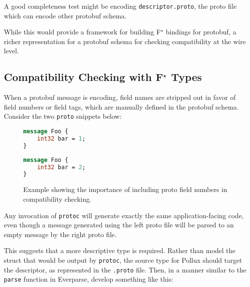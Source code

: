 \documentclass[11pt]{article}
\newcommand{\fstar}{F\(^\star\)}
\theoremstyle{definition}
\begin{document}
A good completeness test might be encoding \texttt{descriptor.proto}, the proto
file which can encode other protobuf schema.

While this would provide a framework for building \fstar{} bindings for
protobuf, a richer representation for a protobuf schema for checking
compatibility at the wire level.

\subsection{Compatibility Checking with \fstar{} Types}

When a protobuf message is encoding, field names are stripped out in favor of
field numbers or field tags, which are manually defined in the protobuf
schema. Consider the two \texttt{proto} snippets below:

\begin{figure}[H]
	\centering
	\begin{minipage}[bt]{0.4\textwidth}
		\begin{lstlisting}[language=proto]
message Foo {
    int32 bar = 1;
}\end{lstlisting}
	\end{minipage}
	\hspace{1cm}
	\begin{minipage}[bt]{0.4\textwidth}
		\begin{lstlisting}[language=proto]
message Foo {
    int32 bar = 2;
}\end{lstlisting}
	\end{minipage}

	\caption[]{Example showing the importance of including proto field numbers in
		compatibility checking.}
\end{figure}

Any invocation of \texttt{protoc} will generate exactly the same
application-facing code, even though a message generated using the left proto
file will be parsed to an empty message by the right proto file.

This suggests that a more descriptive type is required. Rather than model the
struct that would be output by \texttt{protoc}, the source type for Pollux
should target the descriptor, as represented in the \texttt{.proto} file. Then,
in a manner similar to the \texttt{parse} function in Everparse, develop
something like this:
\end{document}
